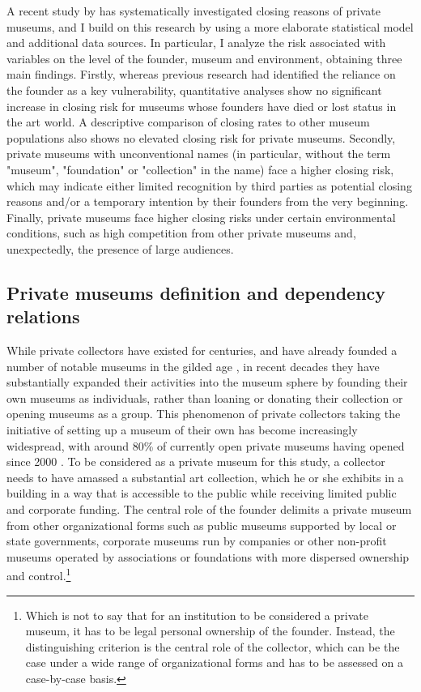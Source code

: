 \documentclass[12pt]{article}
\begin{document}
A recent study by \textcite{Velthuis_Gera_2024_fragility} has systematically investigated closing reasons of private museums, and I build on this research by using a more elaborate statistical model and additional data sources.
In particular, I analyze the risk associated with variables on the level of the founder, museum and environment, obtaining three main findings. 
Firstly, whereas previous research had identified the reliance on the founder as a key vulnerability, quantitative analyses show no significant increase in closing risk for museums whose founders have died or lost status in the art world.
A descriptive comparison of closing rates to other museum populations also shows no elevated closing risk for private museums.
Secondly, private museums with unconventional names (in particular, without the term "museum", "foundation" or "collection" in the name) face a higher closing risk, which may indicate either limited recognition by third parties as potential closing reasons and/or a temporary intention by their founders from the very beginning.
Finally, private museums face higher closing risks under certain environmental conditions, such as high competition from other private museums and, unexpectedly, the presence of large audiences.
\subsection*{Private museums definition and dependency relations}






While private collectors have existed for centuries, and have already founded a number of notable museums in the gilded age \parencite{Higonnet_2003_sight,Duncan_1995_civilizing}, in recent decades they have substantially expanded their activities into the museum sphere by founding their own museums as individuals, rather than loaning or donating their collection or opening museums as a group.
This phenomenon of private collectors taking the initiative of setting up a museum of their own has become increasingly widespread, with around 80\% of currently open private museums having opened since 2000 \parencite{Velthuis_etal_2023_boom}.
To be considered as a private museum for this study, a collector needs to have amassed a substantial art collection, which he or she exhibits in a building in a way that is accessible to the public while receiving limited public and corporate funding.
The central role of the founder delimits a private museum from other organizational forms such as public museums supported by local or state governments, corporate museums run by companies or other non-profit museums operated by associations or foundations with more dispersed ownership and control.\footnote{Which is not to say that for an institution to be considered a private museum, it has to be legal personal ownership of the founder. Instead, the distinguishing criterion is the central role of the collector, which can be the case under a wide range of organizational forms and has to be assessed on a case-by-case basis.}
\end{document}
